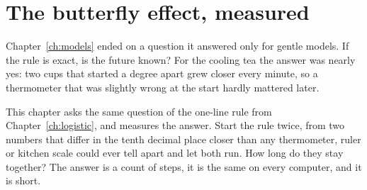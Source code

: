 
\chapter{The butterfly effect, measured}
\label{ch:butterfly}

\noindent
Chapter~\ref{ch:models} ended on a question it answered only for gentle
models. If the rule is exact, is the future known? For the cooling tea the
answer was nearly yes: two cups that started a degree apart grew closer
every minute, so a thermometer that was slightly wrong at the start hardly
mattered later.

This chapter asks the same question of the one-line rule from
Chapter~\ref{ch:logistic}, and measures the answer. Start the rule twice,
from two numbers that differ in the tenth decimal place \dash{} closer than
any thermometer, ruler or kitchen scale could ever tell apart \dash{} and let
both run. How long do they stay together? The answer is a count of steps,
it is the same on every computer, and it is short.

\begin{outcomes}
\end{outcomes}

